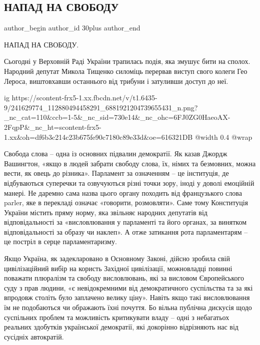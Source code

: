  
 
 
 
 
 
\subsection{НАПАД НА СВОБОДУ}
\label{sec:09_09_2021.fb.30plus.1.napad_na_svobodu}
 
\ifcmt
 author_begin
   author_id 30plus
 author_end
\fi

НАПАД НА СВОБОДУ.

Сьогодні у Верховній Раді України трапилась подія, яка змушує бити на сполох.
Народний депутат Микола Тищенко силоміць перервав виступ свого колеги Гео
Лероса, виштовхавши останнього від трибуни і затуливши доступ до неї.

\ifcmt
  ig https://scontent-frx5-1.xx.fbcdn.net/v/t1.6435-9/241629774_112880494458291_6881921204739655431_n.png?_nc_cat=110&ccb=1-5&_nc_sid=730e14&_nc_ohc=6FJ0ZG0HaeoAX-2FqpP&_nc_ht=scontent-frx5-1.xx&oh=df6b3c214c23b675fe90c7180c89e33d&oe=616321DB
  @width 0.4
  @wrap 
\fi

Свобода слова – одна із основних підвалин демократії. Як казав Джордж
Вашингтон, «якщо в людей забрати свободу слова, їх, німих та безмовних, можна
вести, як овець до різника». Парламент за означенням – це інституція, де
відбуваються суперечки та озвучуються різні точки зору, іноді у доволі
емоційній манері. Не даремно сама назва цього органу походить від французького
слова parler, яке в перекладі означає «говорити, розмовляти». Саме тому
Конституція України містить пряму норму, яка звільняє народних депутатів від
відповідальності за «висловлювання у парламенті та його органах, за винятком
відповідальності за образу чи наклеп». А отже затикання рота парламентарям – це
постріл в серце парламентаризму.

Якщо Україна, як задекларовано в Основному Законі, дійсно зробила свій
цивілізаційний вибір на користь Західної цивілізації, можновладці повинні
поважати плюралізм та свободу висловлювань, які за висловом Європейського суду
з прав людини, «є невідокремними від демократичного суспільства та за які
впродовж століть було заплачено велику ціну». Навіть якщо такі висловлювання їм
не подобаються чи ображають їхні почуття. Бо вільна публічна дискусія щодо
суспільних проблем та можливість критикувати владу – одні з небагатьох реальних
здобутків української демократії, які докорінно відрізняють нас від сусідніх
автократій.

